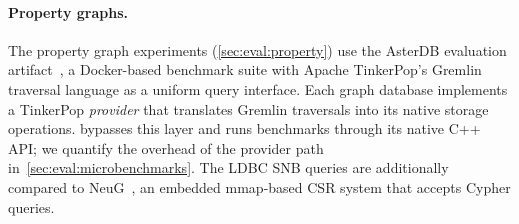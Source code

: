 \paragraph{Property graphs.}
The property graph experiments (\autoref{sec:eval:property}) use the AsterDB evaluation artifact~\cite{moAsterEnhancingLSMstructures2025}, a Docker-based benchmark suite with Apache TinkerPop's Gremlin traversal language as a uniform query interface.
Each graph database implements a TinkerPop \emph{provider} that translates Gremlin traversals into its native storage operations.
\project{} bypasses this layer and runs benchmarks through its native C++ API; we quantify the overhead of the provider path in~\autoref{sec:eval:microbenchmarks}.
The LDBC SNB queries are additionally compared to NeuG~\cite{NeuG2025Alibaba}, an embedded mmap-based CSR system that accepts Cypher queries.


